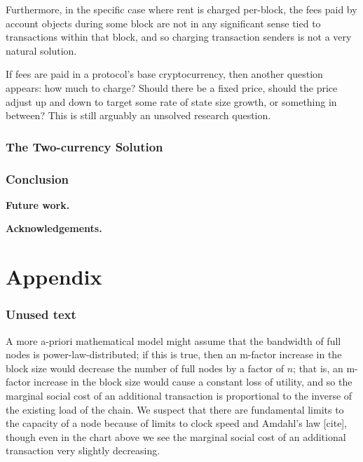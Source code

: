 \documentclass[12pt, final]{article}
\begin{document}
Furthermore, in the specific case where rent is charged per-block, the fees paid by account objects during some block are not in any significant sense tied to transactions within that block, and so charging transaction senders is not a very natural solution.

If fees are paid in a protocol's base cryptocurrency, then another question appears: how much to charge? Should there be a fixed price, should the price adjust up and down to target some rate of state size growth, or something in between? This is still arguably an unsolved research question.



\section{The Two-currency Solution}

\section{Conclusion}


\textbf{Future work.} 

\textbf{Acknowledgements.} 





\newpage
\appendix
\part*{Appendix}

\section{Unused text}



A more a-priori mathematical model might assume that the bandwidth of full nodes is power-law-distributed; if this is true, then an m-factor increase in the block size would decrease the number of full nodes by a factor of $n$; that is, an m-factor increase in the block size would cause a constant loss of utility, and so the marginal social cost of an additional transaction is proportional to the inverse of the existing load of the chain. We suspect that there are fundamental limits to the capacity of a node because of limits to clock speed and Amdahl's law [cite], though even in the chart above we see the marginal social cost of an additional transaction very slightly decreasing. 
\end{document}
